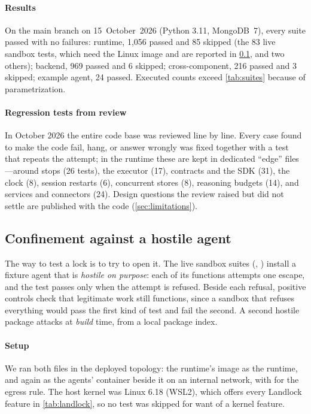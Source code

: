 \paragraph{Results}
On the main branch on 15~October~2026 (Python 3.11, MongoDB~7), every
suite passed with no failures: runtime, 1{,}056 passed and 85 skipped
(the 83 live sandbox tests, which need the Linux image and are reported
in \cref{sec:eval-hostile}, and two others); backend, 969 passed and 6
skipped; cross-component, 216 passed and 3 skipped; example agent, 24
passed. Executed counts exceed \cref{tab:suites} because of
parametrization.

\paragraph{Regression tests from review}
In October 2026 the entire code base was reviewed line by line. Every
case found to make the code fail, hang, or answer wrongly was fixed
together with a test that repeats the attempt; in the runtime these
are kept in dedicated ``edge'' files---around stops (26 tests), the
executor (17), contracts and the SDK (31), the clock (8), session
restarts (6), concurrent stores (8), reasoning budgets (14), and
services and connectors (24). Design questions the review raised but
did not settle are published with the code (\cref{sec:limitations}).

\subsection{Confinement against a hostile agent}
\label{sec:eval-hostile}

The way to test a lock is to try to open it. The live sandbox suites
(,
) install a fixture agent that is
\emph{hostile on purpose}: each of its functions attempts one escape,
and the test passes only when the attempt is refused. Beside each
refusal, positive controls check that legitimate work still functions,
since a sandbox that refuses everything would pass the first kind of
test and fail the second. A second hostile package attacks at
\emph{build} time, from a local package index.

\paragraph{Setup}
We ran both files in the deployed topology: the runtime's image as the
runtime, and again as the agents' container beside it on an internal
network, with  for the egress rule. The host kernel was
Linux 6.18 (WSL2), which offers every Landlock feature in
\cref{tab:landlock}, so no test was skipped for want of a kernel
feature.

